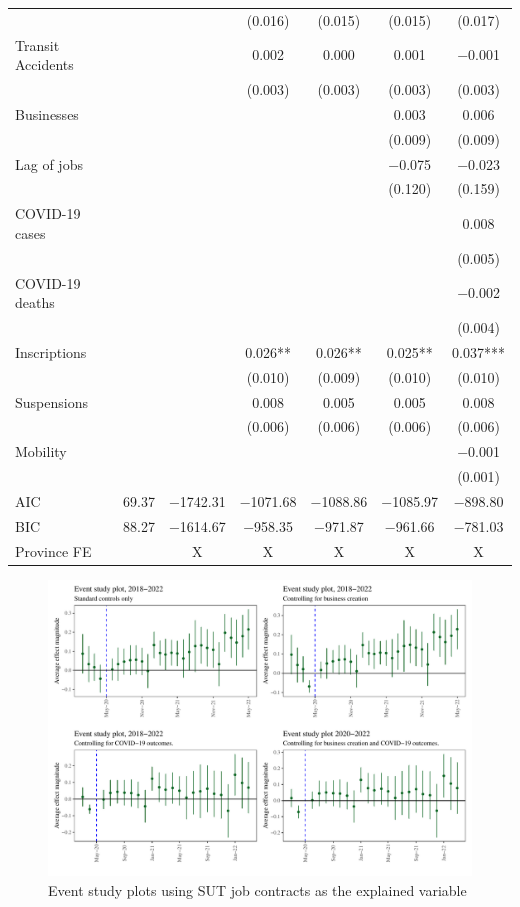 \documentclass[11pt,a4paper]{article}\usepackage[]{graphicx}\usepackage[]{xcolor}
\makeatletter
\def\maxwidth{ %
  \ifdim\Gin@nat@width>\linewidth
    \linewidth
  \else
    \Gin@nat@width
  \fi
}
\newenvironment{knitrout}{}{} %
\makeatother
\begin{document}
\begin{table}[h]
\begin{tabular}[t]{lcccccc}
 &  &  & (\num{0.016}) & (\num{0.015}) & (\num{0.015}) & (\num{0.017})\\
Transit Accidents &  &  & \num{0.002} & \num{0.000} & \num{0.001} & \num{-0.001}\\
 &  &  & (\num{0.003}) & (\num{0.003}) & (\num{0.003}) & (\num{0.003})\\
Businesses &  &  &  &  & \num{0.003} & \num{0.006}\\
 &  &  &  &  & (\num{0.009}) & (\num{0.009})\\
Lag of jobs &  &  &  &  & \num{-0.075} & \num{-0.023}\\
 &  &  &  &  & (\num{0.120}) & (\num{0.159})\\
COVID-19 cases &  &  &  &  &  & \num{0.008}\\
 &  &  &  &  &  & (\num{0.005})\\
COVID-19 deaths &  &  &  &  &  & \num{-0.002}\\
 &  &  &  &  &  & (\num{0.004})\\
Inscriptions &  &  & \num{0.026}** & \num{0.026}** & \num{0.025}** & \num{0.037}***\\
 &  &  & (\num{0.010}) & (\num{0.009}) & (\num{0.010}) & (\num{0.010})\\
Suspensions &  &  & \num{0.008} & \num{0.005} & \num{0.005} & \num{0.008}\\
 &  &  & (\num{0.006}) & (\num{0.006}) & (\num{0.006}) & (\num{0.006})\\
Mobility &  &  &  &  &  & \num{-0.001}\\
 &  &  &  &  &  & (\num{0.001})\\
\midrule
AIC & \num{69.37} & \num{-1742.31} & \num{-1071.68} & \num{-1088.86} & \num{-1085.97} & \num{-898.80}\\
BIC & \num{88.27} & \num{-1614.67} & \num{-958.35} & \num{-971.87} & \num{-961.66} & \num{-781.03}\\
Province FE &  & X & X & X & X & X\\
\bottomrule
\end{tabular}


\end{table}

\begin{figure}[h]
\caption{Event study plots using SUT job contracts as the explained variable}
\begin{knitrout}
\color{fgcolor}
\includegraphics[width=\maxwidth]{figure/event-study1-1} 
\end{knitrout}
\end{figure}
\end{document}

